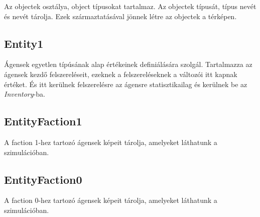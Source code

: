 Az objectek osztálya, object típusokat tartalmaz.
Az objectek típusát, típus nevét és nevét tárolja.
Ezek származtatásával jönnek létre az objectek a térképen.

\subsection{Entity1}

Ágensek egyetlen típúsának alap értékeinek definiálására szolgál.
Tartalmazza az ágensek kezdő felszereléseit, ezeknek a felszereléseknek a változói itt kapnak értéket.
És itt kerülnek felszerelésre az ágensre statisztikailag és kerülnek be az \textit{Inventory}-ba.

\subsection{EntityFaction1}

A faction 1-hez tartozó ágensek képeit tárolja, amelyeket láthatunk a szimulációban.

\subsection{EntityFaction0}

A faction 0-hez tartozó ágensek képeit tárolja, amelyeket láthatunk a szimulációban.


